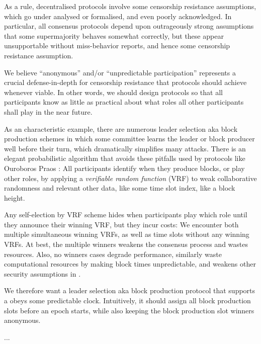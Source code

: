 

As a rule, decentralised protocols involve some censorship resistance assumptions, which go under analysed or formalised, and even poorly acknowledged.  In particular, all consensus protocols depend upon outrageously strong assumptions that some supermajority behaves somewhat correctly, but these appear unsupportable without miss-behavior reports, and hence some censorship resistance assumption. 

We believe ``anonymous'' and/or ``unpredictable participation'' represents a crucial defense-in-depth for censorship resistance that protocols should achieve whenever viable.  In other words, we should design protocols so that all participants know as little as practical about what roles all other participants shall play in the near future. 

As an characteristic example, there are numerous leader selection aka block production schemes in which some committee learns the leader or block producer well before their turn, which dramatically simplifies many attacks.  There is an elegant probabilistic algorithm that avoids these pitfalls used by protocols like Ouroboros Praos \cite{Praos}:  All participants identify when they produce blocks, or play other roles, by applying a {\em verifiable random function} (VRF) to weak collaborative randomness and relevant other data, like some time slot index, like a block height. 

Any self-election by VRF scheme hides when participants play which role until they announce their winning VRF, but they incur costs:  We encounter both multiple simultaneous winning VRFs, as well as time slots without any winning VRFs.  At best, the multiple winners weakens the consensus process and wastes resources.  Also, no winners cases degrade performance, similarly waste computational resources by making block times unpredictable, and weakens other security assumptions in \cite{Praos}.

We therefore want a leader selection aka block production protocol that supports a obeys some predictable clock.  Intuitively, it should assign all block production slots before an epoch starts, while also keeping the block production slot winners anonymous.  

...

